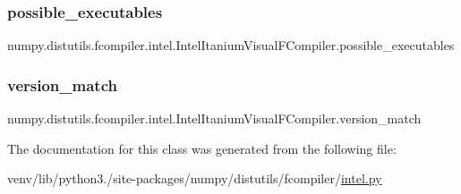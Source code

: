 \subsubsection{\texorpdfstring{possible\+\_\+executables}{possible\_executables}}
{\footnotesize\ttfamily numpy.\+distutils.\+fcompiler.\+intel.\+Intel\+Itanium\+Visual\+F\+Compiler.\+possible\+\_\+executables\hspace{0.3cm}{\ttfamily [static]}}

\mbox{\label{classnumpy_1_1distutils_1_1fcompiler_1_1intel_1_1IntelItaniumVisualFCompiler_a2c7c6428c972bc320aa9fb69d6892ac4}} 
\subsubsection{\texorpdfstring{version\+\_\+match}{version\_match}}
{\footnotesize\ttfamily numpy.\+distutils.\+fcompiler.\+intel.\+Intel\+Itanium\+Visual\+F\+Compiler.\+version\+\_\+match\hspace{0.3cm}{\ttfamily [static]}}



The documentation for this class was generated from the following file\+:\begin{DoxyCompactItemize}
\item 
venv/lib/python3./site-\/packages/numpy/distutils/fcompiler/\hyperlink{intel_8py}{intel.\+py}\end{DoxyCompactItemize}
